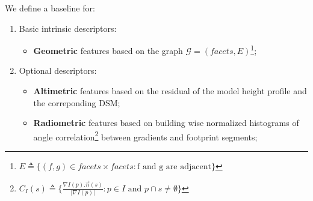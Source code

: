 \documentclass[portrait, a0paper, margin=.5cm]{baposter}
\begin{document}
\begin{poster}



        {
            We define a baseline for:
            \begin{enumerate}[label = (\roman*)., font=\color{black}, itemsep=15pt]
                \item Basic intrinsic descriptors:
                \begin{itemize}[label=$\blacktriangleright$, font=\color{IGNGreen}]
                    \item \textbf{Geometric} features based on the graph $\mathscr{G}=(facets, E)$\footnote{$E \triangleq \{(f, g) \in facets \times facets: \text{f and g are adjacent}\}$};
                \end{itemize}
                \item Optional descriptors:
                \begin{itemize}[label=$\blacktriangleright$, font=\color{blue}, itemsep=10pt]
                    \item \textbf{Altimetric} features based on the residual of the model height profile and the correponding DSM\@;
                    \item \textbf{Radiometric} features based on building wise normalized histograms of angle correlation\footnote{$C_I(s) \triangleq \{ \frac{\nabla I(p) . \vec{n}(s)}{\vert\nabla I(p)\vert}: p \in I \text{ and } p \cap s \neq \emptyset \}$} between gradients and footprint segments;
                \end{itemize}
            \end{enumerate}
        }


\end{poster}
\end{document}
